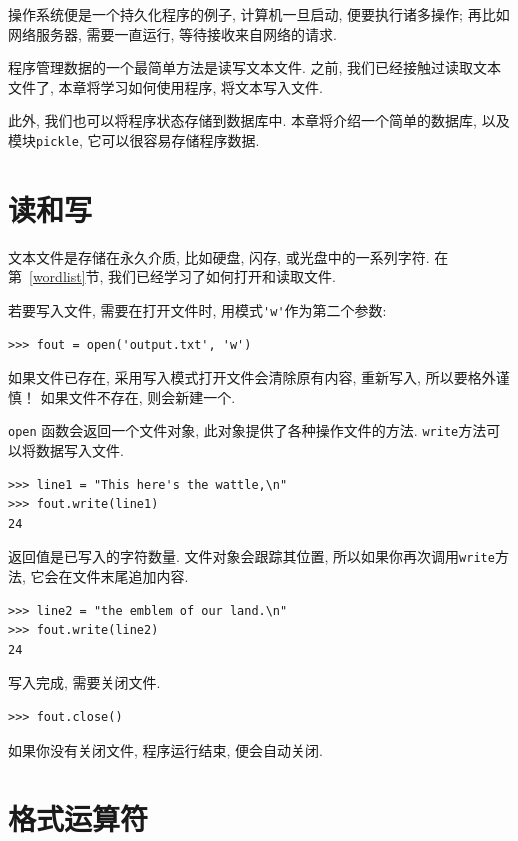 \documentclass[10pt]{book}
\begin{document}
操作系统便是一个持久化程序的例子, 计算机一旦启动, 便要执行诸多操作;
再比如网络服务器, 需要一直运行, 等待接收来自网络的请求. 

程序管理数据的一个最简单方法是读写文本文件. 
之前, 我们已经接触过读取文本文件了, 
本章将学习如何使用程序, 将文本写入文件. 

此外, 我们也可以将程序状态存储到数据库中. 
本章将介绍一个简单的数据库, 以及模块{\tt pickle}, 
它可以很容易存储程序数据. 


\section{读和写}

文本文件是存储在永久介质, 比如硬盘, 闪存, 或光盘中的一系列字符. 
在第~\ref{wordlist}节, 我们已经学习了如何打开和读取文件. 

若要写入文件, 需要在打开文件时, 用模式\verb"'w'"作为第二个参数:

\begin{verbatim}
>>> fout = open('output.txt', 'w')
\end{verbatim}
%
如果文件已存在, 采用写入模式打开文件会清除原有内容, 重新写入, 所以要格外谨慎！
如果文件不存在, 则会新建一个. 

{\tt open} 函数会返回一个文件对象, 此对象提供了各种操作文件的方法. 
{\tt write}方法可以将数据写入文件. 

\begin{verbatim}
>>> line1 = "This here's the wattle,\n"
>>> fout.write(line1)
24
\end{verbatim}
%

返回值是已写入的字符数量. 
文件对象会跟踪其位置, 所以如果你再次调用{\tt write}方法, 
它会在文件末尾追加内容. 

\begin{verbatim}
>>> line2 = "the emblem of our land.\n"
>>> fout.write(line2)
24
\end{verbatim}
%
写入完成, 需要关闭文件. 

\begin{verbatim}
>>> fout.close()
\end{verbatim}
%
%
如果你没有关闭文件, 程序运行结束, 便会自动关闭. 


\section{格式运算符}
\end{document}
